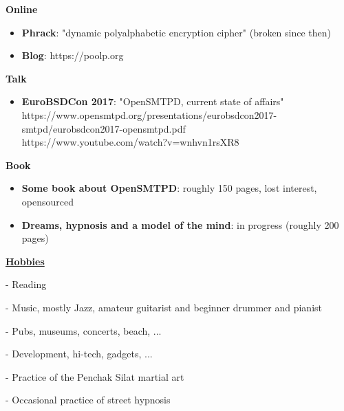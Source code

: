 \documentclass[a4paper,10pt]{letter}
\begin{document}
\textbf{Online}
\begin{itemize}
\item	\textbf{Phrack}: "dynamic polyalphabetic encryption cipher" (broken since then)
\item	\textbf{Blog}: https://poolp.org\\
\end{itemize}

\textbf{Talk}
\begin{itemize}
\item	\textbf{EuroBSDCon 2017}: "OpenSMTPD, current state of affairs"\\
  https://www.opensmtpd.org/presentations/eurobsdcon2017-smtpd/eurobsdcon2017-opensmtpd.pdf\\
  https://www.youtube.com/watch?v=wnhvn1rsXR8\\
\end{itemize}


\textbf{Book}
\begin{itemize}
\item	\textbf{Some book about OpenSMTPD}: roughly 150 pages, lost interest, opensourced
\item	\textbf{Dreams, hypnosis and a model of the mind}: in progress (roughly 200 pages)\\
\end{itemize}


\underline{\textbf{Hobbies}}\\
\begin{description}
\item - Reading
\item - Music, mostly Jazz, amateur guitarist and beginner drummer and pianist
\item - Pubs, museums, concerts, beach, ...
\item - Development, hi-tech, gadgets, ...
\item - Practice of the Penchak Silat martial art
\item - Occasional practice of street hypnosis\\
\end{description}
\end{document}
